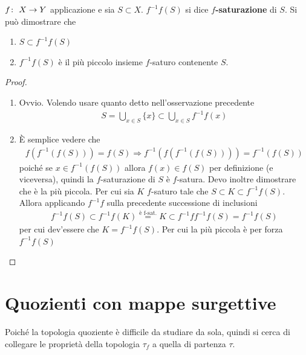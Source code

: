 \begin{theorem}
	$f \colon\ X \rightarrow Y$ applicazione e sia $S \subset X$. $f^{-1}f(S)$ si dice \textbf{$f$-saturazione} di $S$. Si può dimostrare che 
	\begin{enumerate}
		\item $S \subset f^{-1}f(S)$
		\item $f^{-1}f(S)$ è il più piccolo insieme $f$-saturo contenente $S$.
	\end{enumerate}
\end{theorem}
\begin{proof}
	\begin{enumerate}
		\item Ovvio. Volendo usare quanto detto nell'osservazione precedente
		\begin{equation}
		\begin{aligned}
			S = \bigcup_{x\in S} \{x\} \subset \bigcup_{x \in S} f^{-1}f(x)
		\end{aligned}
		\end{equation}
		\item È semplice vedere che
		\begin{equation}
		\begin{aligned}
			f(f^{-1}(f(S))) = f(S) \Longrightarrow f^{-1}(f(f^{-1}(f(S)))) = f^{-1}(f(S))
		\end{aligned}
		\end{equation}
		poiché se $x \in f^{-1}(f(S))$ allora $f(x) \in f(S)$ per definizione (e viceversa), quindi la $f$-saturazione di $S$ è $f$-satura. Devo inoltre dimostrare che è la più piccola. Per cui sia $K$ $f$-saturo tale che $S \subset K \subset f^{-1}f(S)$. Allora applicando $f^{-1}f$ sulla precedente successione di inclusioni
		\begin{equation}
		\begin{aligned}
			f^{-1}f(S) \subset f^{-1}f(K) \overset{\text{è f-sat.}}{=} K \subset f^{-1}ff^{-1}f(S) = f^{-1}f(S) 
		\end{aligned}
		\end{equation}
		per cui dev'essere che $K = f^{-1}f(S)$. Per cui la più piccola è per forza $f^{-1}f(S)$ 
	\end{enumerate}
\end{proof}


\section{Quozienti con mappe surgettive}

Poiché la topologia quoziente è difficile da studiare da sola, quindi si  cerca di collegare le proprietà della topologia $\tau_f$ a quella di partenza $\tau$.


